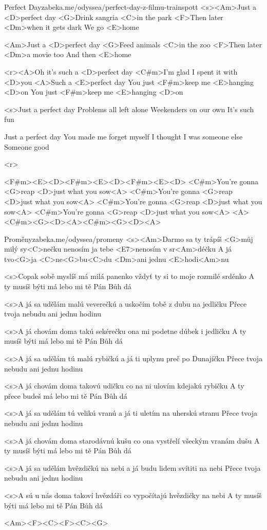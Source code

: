 \begin{song}{49}{Perfect Day}{zabeka.me/odyssea/perfect-day-z-filmu-trainspott}
	<s><Am>Just a <D>perfect day
	<G>Drink sangria <C>in the park
	<F>Then later <Dm>when it gets dark
	We go <E>home

	<Am>Just a <D>perfect day
	<G>Feed animals <C>in the zoo
	<F>Then later <Dm>a movie too
	And then <E>home

	<r><A>Oh it's such a <D>perfect day
	<C#m>I'm glad I spent it with <D>you
	<A>Such a <E>perfect day
	You just <F#m>keep me <E>hanging <D>on
	You just <F#m>keep me <E>hanging <D>on

	<s>Just a perfect day
	Problems all left alone
	Weekenders on our own
	It's such fun

	Just a perfect day
	You made me forget myself
	I thought I was someone else
	Someone good

	<r>

	<F#m><E><D><F#m><E><D><F#m><E><D>
	<C#m>You're gonna <G>reap <D>just what you sow<A>
	<C#m>You're gonna <G>reap <D>just what you sow<A>
	<C#m>You're gonna <G>reap <D>just what you sow<A>
	<C#m>You're gonna <G>reap <D>just what you sow<A>
	<A><C#m><G><D><A><C#m><G><D><A>
\end{song}
\begin{song}[Čechomor]{50}{Proměny}{zabeka.me/odyssea/promeny}
	<s><Am>Darmo sa ty trápíš <G>můj milý sy<C>nečku
	nenosím ja tebe <E7>nenosím v sr<Am>déčku
	A já tvo<G>ja <C>ne<G>bu<C>du <Dm>ani jednu <E>hodi<Am>nu

	<s>Copak sobě myslíš má milá panenko
	vždyť ty si to moje rozmilé srdénko
	A ty musíš býti má lebo mi tě Pán Bůh dá

	<s>A já sa udělám malú veverečkú
	a uskočím tobě z dubu na jedličku
	Přece tvoja nebudu ani jednu hodinu

	<s>A já chovám doma takú sekérečku
	ona mi podetne dúbek i jedličku
	A ty musíš býti má lebo mi tě Pán Bůh dá

	<s>A já sa udělám tú malú rybičkú
	a já ti uplynu preč po Dunajíčku
	Přece tvoja nebudu ani jednu hodinu

	<s>A já chovám doma takovú udičku
	co na ni ulovím kdejakú rybičku
	A ty přece budeš má lebo mi tě Pán Bůh dá

	<s>A já sa udělám tú velikú vranú
	a já ti uletím na uherskú stranu
	Přece tvoja nebudu ani jednu hodinu

	<s>A já chovám doma starodávnú kušu
	co ona vystřelí všeckým vranám dušu
	A ty musíš býti má lebo mi tě Pán Bůh dá

	<s>A já sa udělám hvězdičkú na nebi
	a já budu lidem svítiti na nebi
	Přece tvoja nebudu ani jednu hodinu

	<s>A sú u nás doma takoví hvězdáři
	co vypočítajú hvězdičky na nebi
	A ty musíš býti má lebo mi tě Pán Bůh dá

	<Am><F><C><F><C><G>

\end{song}
